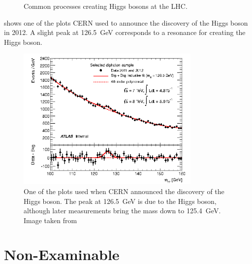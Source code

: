 \documentclass[fleqn]{NotesClass}
\newcommand{\Pparticle}[1]{\symup{#1}}
\newcommand{\Pt}{\ensuremath{\Pparticle{t}}}
\newcommand{\Pb}{\ensuremath{\Pparticle{b}}}
\newcommand{\PW}{\ensuremath{\Pparticle{W}}}
\newcommand{\Pq}{\ensuremath{\Pparticle{q}}}
\newcommand{\Phiggs}{\ensuremath{\Pparticle{H}}}
\begin{document}
\begin{figure}
        \caption{Common processes creating Higgs bosons at the LHC.}
        \label{fig:higgs production}
    \end{figure}
    
     shows one of the plots CERN used to announce the discovery of the Higgs boson in 2012.
    A slight peak at \qty{126.5}{\giga\electronvolt} corresponds to a resonance for creating the Higgs boson.
    
    \begin{figure}
        \includegraphics[width=0.8\textwidth]{images/higgs-discovery}
        \caption{One of the plots used when CERN announced the discovery of the Higgs boson. The peak at \qty{126.5}{\giga\electronvolt} is due to the Higgs boson, although later measurements bring the mass down to \qty{125.4}{\giga\electronvolt}. Image taken from \cite{higgsDiscovery}}
        \label{fig:higgs discovery}
    \end{figure}
    
    \part{Non-Examinable}
\end{document}
